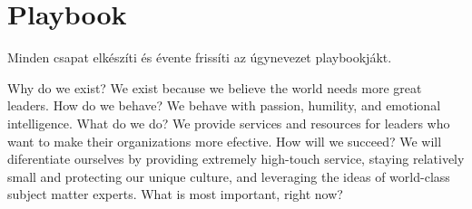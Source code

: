 \section{Playbook}
Minden csapat elkészíti és évente frissíti az úgynevezet playbookjákt.

Why do we exist? We exist because we believe the world needs more great leaders. How do we behave? We behave with passion, humility, and emotional intelligence. What do we do? We provide services and resources for leaders who want to make their organizations more efective. How will we succeed? We will diferentiate ourselves by providing extremely high-touch service, staying relatively small and protecting our unique culture, and leveraging the ideas of world-class subject matter experts. What is most important, right now?